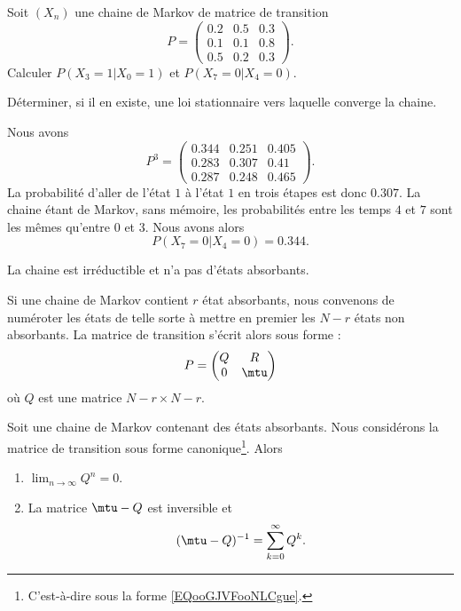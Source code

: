 \begin{example}
	Soit \( (X_n)\) une chaine de Markov de matrice de transition
	\begin{equation}
		P=\begin{pmatrix}
			0.2 & 0.5 & 0.3 \\
			0.1 & 0.1 & 0.8 \\
			0.5 & 0.2 & 0.3
		\end{pmatrix}.
	\end{equation}
	Calculer \( P(X_3=1|X_0=1)\) et \( P(X_7=0|X_4=0)\).

	Déterminer, si il en existe, une loi stationnaire vers laquelle converge la chaine.

	Nous avons
	\begin{equation}
		P^3=\begin{pmatrix}
			0.344 & 0.251 & 0.405 \\
			0.283 & 0.307 & 0.41  \\
			0.287 & 0.248 & 0.465
		\end{pmatrix}.
	\end{equation}
	La probabilité d'aller de l'état \( 1\) à l'état \( 1\) en trois étapes est donc \( 0.307\). La chaine étant de Markov, sans mémoire, les probabilités entre les temps \( 4\) et \( 7\) sont les mêmes qu'entre \( 0\) et \( 3\). Nous avons alors
	\begin{equation}
		P(X_7=0|X_4=0)=0.344.
	\end{equation}

	La chaine est irréductible et n'a pas d'états absorbants.
\end{example}

Si une chaine de Markov contient \( r\) état absorbants, nous convenons de numéroter les états de telle sorte à mettre en premier les \( N-r\) états non absorbants. La matrice de transition s'écrit alors sous forme  :
\begin{equation}        \label{EQooGJVFooNLCgue}
	P=\begin{pmatrix}
		Q & R    \\
		0 & \mtu
	\end{pmatrix}
\end{equation}
où \( Q\) est une matrice \( N-r\times N-r\).

\begin{proposition}     \label{PROPooUNBDooVhXZxi}
	Soit une chaine de Markov contenant des états absorbants. Nous considérons la matrice de transition sous forme canonique\footnote{C'est-à-dire sous la forme \eqref{EQooGJVFooNLCgue}.}. Alors
	\begin{enumerate}
		\item
		      \( \lim_{n\to \infty} Q^n=0\).
		\item
		      La matrice \( \mtu-Q\) est inversible et
		      \begin{equation}
			      (\mtu-Q)^{-1}=\sum_{k=0}^{\infty}Q^k.
		      \end{equation}
	\end{enumerate}
\end{proposition}

